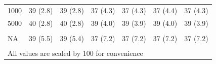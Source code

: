 \documentclass[AMA,STIX1COL,doublespace]{WileyNJD-v2}
\begin{document}
\begin{table}
\begin{tabular}[t]{lcccccc}
\hspace{1em}1000 & 39 (2.8) & 39 (2.8) & 37 (4.3) & 37 (4.3) & 37 (4.4) & 37 (4.3)\\
\hspace{1em}5000 & 40 (2.8) & 40 (2.8) & 39 (4.0) & 39 (3.9) & 39 (4.0) & 39 (3.9)\\
\addlinespace[0.75em]
\multicolumn{7}{l}{\textbf{Overall}}\\
\hline
\hspace{1em}NA & 39 (5.5) & 39 (5.4) & 37 (7.2) & 37 (7.2) & 37 (7.2) & 37 (7.2)\\
\bottomrule
\multicolumn{7}{l}{\textsuperscript{} All values are scaled by 100 for convenience}\\
\end{tabular}
\end{table}
\end{document}

